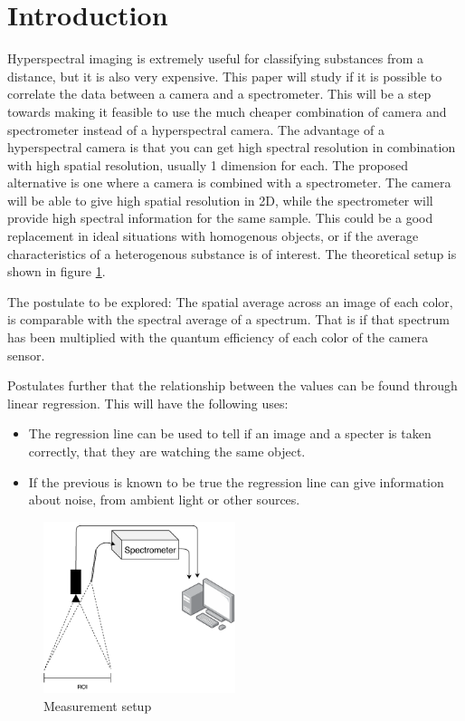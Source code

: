 \section{Introduction}
Hyperspectral imaging is extremely useful for classifying substances from a distance, but it is also very expensive. This paper will study if it is possible to correlate the data between a camera and a spectrometer. This will be a step towards making it feasible to use the much cheaper combination of camera and spectrometer instead of a hyperspectral camera. The advantage of a hyperspectral camera is that you can get high spectral resolution in combination with high spatial resolution, usually 1 dimension for each. The proposed alternative is one where a camera is combined with a spectrometer. The camera will be able to give high spatial resolution in 2D, while the spectrometer will provide high spectral information for the same sample. This could be a good replacement in ideal situations with homogenous objects, or if the average characteristics of a heterogenous substance is of interest. The theoretical setup is shown in figure \ref{fig:measurement_setup}. 

The postulate to be explored: 
The spatial average across an image of each color, is comparable with the spectral average of a spectrum. That is if that spectrum has been multiplied with the quantum efficiency of each color of the camera sensor. 

Postulates further that the relationship between the values can be found through linear regression. This will have the following uses: 
\begin{itemize}
    \item The regression line can be used to tell if an image and a specter is taken correctly, that they are watching the same object. 
    \item If the previous is known to be true the regression line can give information about noise, from ambient light or other sources. 
\end{itemize}


\begin{figure}[h]
    \centering
    \includegraphics[width=0.5\textwidth]{figures/pt_setup.pdf}
    \caption{Measurement setup}
    \label{fig:measurement_setup}
\end{figure}


